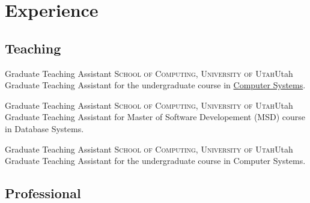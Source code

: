 \documentclass[11pt,a4paper,sans]{moderncv}
\begin{document}

\section{Experience}

    \subsection{Teaching}

                {Graduate Teaching Assistant}
                {\textsc{School of Computing, University of Utah}}{Utah}
                {}
                {
                    Graduate Teaching Assistant for the undergraduate course in
                    \href{http://www.cs.utah.edu/~parker/4400_Fa19.html}{Computer Systems}.
                }

                {Graduate Teaching Assistant}
                {\textsc{School of Computing, University of Utah}}{Utah}
                {}
                {
                    Graduate Teaching Assistant for Master of Software
                    Developement (MSD) course in Database Systems.
                }

                {Graduate Teaching Assistant}
                {\textsc{School of Computing, University of Utah}}{Utah}
                {}
                {
                    Graduate Teaching Assistant for the undergraduate course in
                    Computer Systems.
                }


    \subsection{Professional}
\end{document}
